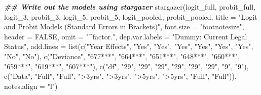 \documentclass[a4paper,nobind]{templates/ociamthesis}
\newenvironment{Shaded}{\begin{snugshade}}{\end{snugshade}}
\newcommand{\AttributeTok}[1]{\textcolor[rgb]{0.77,0.63,0.00}{#1}}
\newcommand{\ConstantTok}[1]{\textcolor[rgb]{0.00,0.00,0.00}{#1}}
\newcommand{\DocumentationTok}[1]{\textcolor[rgb]{0.56,0.35,0.01}{\textbf{\textit{#1}}}}
\newcommand{\FunctionTok}[1]{\textcolor[rgb]{0.00,0.00,0.00}{#1}}
\newcommand{\NormalTok}[1]{#1}
\newcommand{\StringTok}[1]{\textcolor[rgb]{0.31,0.60,0.02}{#1}}
\renewenvironment{Shaded}
{
  \vspace{10pt}%
  \begin{snugshade}%
}{%
  \end{snugshade}%
  \vspace{8pt}%
}
\begin{document}
\begin{landscape}

\begin{Shaded}
\begin{Highlighting}[]
\DocumentationTok{\#\# Write out the models using stargazer}
\FunctionTok{stargazer}\NormalTok{(logit\_full, probit\_full, logit\_3, probit\_3, logit\_5, probit\_5, logit\_pooled, probit\_pooled, }\AttributeTok{title =} \StringTok{"Logit and Probit Models (Standard Errors in Brackets)"}\NormalTok{, }\AttributeTok{font.size =} \StringTok{"footnotesize"}\NormalTok{, }\AttributeTok{header =} \ConstantTok{FALSE}\NormalTok{, }\AttributeTok{omit =} \StringTok{"\^{}factor."}\NormalTok{, }\AttributeTok{dep.var.labels =} \StringTok{"Dummy: Current Legal Status"}\NormalTok{, }\AttributeTok{add.lines =} \FunctionTok{list}\NormalTok{(}\FunctionTok{c}\NormalTok{(}\StringTok{"Year Effects"}\NormalTok{, }\StringTok{"Yes"}\NormalTok{, }\StringTok{"Yes"}\NormalTok{, }\StringTok{"Yes"}\NormalTok{, }\StringTok{"Yes"}\NormalTok{, }\StringTok{"Yes"}\NormalTok{, }\StringTok{"Yes"}\NormalTok{, }\StringTok{"No"}\NormalTok{, }\StringTok{"No"}\NormalTok{), }\FunctionTok{c}\NormalTok{(}\StringTok{"Deviance"}\NormalTok{, }\StringTok{"677***"}\NormalTok{, }\StringTok{"664***"}\NormalTok{, }\StringTok{"651***"}\NormalTok{, }\StringTok{"648***"}\NormalTok{, }\StringTok{"660***"}\NormalTok{, }\StringTok{"659***"}\NormalTok{, }\StringTok{"619***"}\NormalTok{, }\StringTok{"607***"}\NormalTok{), }\FunctionTok{c}\NormalTok{(}\StringTok{"df"}\NormalTok{, }\StringTok{"29"}\NormalTok{, }\StringTok{"29"}\NormalTok{, }\StringTok{"29"}\NormalTok{, }\StringTok{"29"}\NormalTok{, }\StringTok{"29"}\NormalTok{, }\StringTok{"29"}\NormalTok{, }\StringTok{"9"}\NormalTok{, }\StringTok{"9"}\NormalTok{),}
\FunctionTok{c}\NormalTok{(}\StringTok{"Data"}\NormalTok{, }\StringTok{"Full"}\NormalTok{, }\StringTok{"Full"}\NormalTok{, }\StringTok{"\textgreater{}3yrs"}\NormalTok{, }\StringTok{"\textgreater{}3yrs"}\NormalTok{, }\StringTok{"\textgreater{}5yrs"}\NormalTok{, }\StringTok{"\textgreater{}5yrs"}\NormalTok{, }\StringTok{"Full"}\NormalTok{, }\StringTok{"Full"}\NormalTok{)), }\AttributeTok{notes.align =} \StringTok{"l"}\NormalTok{)}
\end{Highlighting}
\end{Shaded}


\end{landscape}
\end{document}
